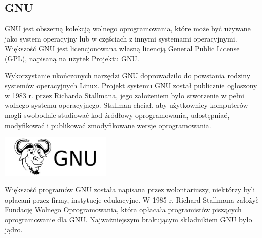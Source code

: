 \documentclass[10pt,a4paper]{report}
\begin{document}
\begin{adjustwidth}{2cm}{2cm}
\section{GNU}
\begin{minipage}{1\linewidth}
GNU jest obszerną kolekcją wolnego oprogramowania, które może być używane jako system operacyjny lub w częściach z innymi systemami operacyjnymi. Większość GNU jest licencjonowana własną licencją General Public License (GPL), napisaną na użytek Projektu GNU.
\end{minipage}
\begin{minipage}{1\linewidth}
Wykorzystanie ukończonych narzędzi GNU doprowadziło do powstania rodziny systemów operacyjnych Linux. 
Projekt systemu GNU został publicznie ogłoszony w 1983 r. przez Richarda Stallmana, jego założeniem było stworzenie w pełni wolnego systemu operacyjnego. Stallman chciał, aby użytkownicy komputerów mogli swobodnie studiować kod źródłowy oprogramowania, udostępniać, modyfikować i publikować zmodyfikowane wersje oprogramowania. 
\end{minipage}
 \begin{minipage}{\linewidth}
\begin{center}
  \includegraphics[width=200px]{img/gnu.jpg}
\end{center}
\end{minipage}
\begin{minipage}{1\linewidth}
\vspace{0.2cm}
Większość programów GNU została napisana przez wolontariuszy, niektórzy byli opłacani przez firmy, instytucje edukacyjne. W 1985 r. Richard Stallmana założył Fundację Wolnego Oprogramowania, która opłacała programistów piszących oprogramowanie dla GNU. Najważniejszym brakującym składnikiem GNU było jądro. 
\end{minipage}

\end{adjustwidth}
\end{document}
